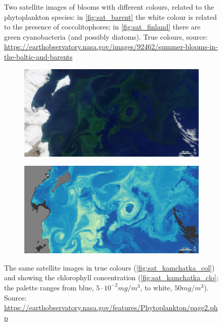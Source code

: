 \begin{figure} [H]
\begin{subfigure}[b]{.45\textwidth}
        \caption{}
        \label{fig:sat_finland}
    \end{subfigure}
    \caption{Two satellite images of blooms with different colours, related to the phytoplankton species: in \autoref{fig:sat_barent} the white colour is related to the presence of coccolitophores; in \autoref{fig:sat_finland} there are green cyanobacteria (and possibly diatoms). True colours, source: \url{https://earthobservatory.nasa.gov/images/92462/summer-blooms-in-the-baltic-and-barents}}
    \label{fig:sat_colour}
\end{figure}

\begin{figure} [H]
    \centering
    \begin{subfigure}[b]{\textwidth}
        \includegraphics[width=\textwidth]{img/kamchatka_amo_2010153_color.jpg}
        \caption{}
        \label{fig:sat_kamchatka_col}
    \end{subfigure}
    \begin{subfigure}[b]{\textwidth}
        \includegraphics[width=\textwidth]{img/kamchatka_amo_2010153_chlorophyll.jpg}
        \caption{}
        \label{fig:sat_kamchatka_clo}
    \end{subfigure}
    \caption{The same satellite images in true colours (\autoref{fig:sat_kamchatka_col}) and showing the chlorophyll concentration (\autoref{fig:sat_kamchatka_clo}; the palette ranges from blue, $5\cdot 10^{-2}mg/m^3$, to white, $50mg/m^3$). Source: \url{https://earthobservatory.nasa.gov/features/Phytoplankton/page2.php}}
    \label{fig:sat_kamchatka}
\end{figure}


